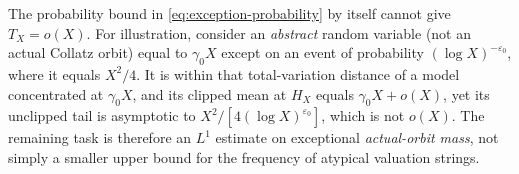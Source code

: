 \begin{remark}
\label{rem:exception-mass-obstruction}
The probability bound in \eqref{eq:exception-probability} by itself
cannot give $T_X=o(X)$. For illustration, consider an \emph{abstract}
random variable (not an actual Collatz orbit) equal to
$\gamma_0X$ except on an event of probability
$(\log X)^{-\varepsilon_0}$, where it equals $X^2/4$.
It is within that total-variation distance of a model concentrated at
$\gamma_0 X$, and its clipped mean at $H_X$ equals
$\gamma_0X+o(X)$, yet its unclipped tail is asymptotic to
$X^2/[4(\log X)^{\varepsilon_0}]$, which is not $o(X)$.
The remaining task is therefore an $L^1$ estimate on exceptional
\emph{actual-orbit mass}, not simply a smaller upper bound for the
frequency of atypical valuation strings.
\end{remark}
